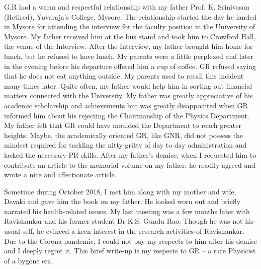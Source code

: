 G.R had a warm and respectful relationship with my father Prof. K. Srinivasan (Retired), Yuvaraja’s College, Mysore. The relationship started the day he landed in Mysore for attending the interview for the faculty position in the University of Mysore. My father received him at the bus stand and took him to Crawford Hall, the venue of the Interview. After the Interview, my father brought him home for lunch, but he refused to have lunch. My parents were a little perplexed and later in the evening before his departure offered him a cup of coffee.  GR refused saying that he does not eat anything outside. My parents used to recall this incident many times later. Quite often, my father would help him in sorting out financial matters connected with the University. My father was greatly appreciative of his academic scholarship and achievements but was greatly disappointed when GR informed him about his rejecting the Chairmanship of the Physics Department. My father felt that GR could have moulded the Department to reach greater heights.  Maybe, the academically oriented GR, like GNR, did not possess the mindset required for tackling the nitty-gritty of day to day administration and lacked the necessary PR skills. After my father’s demise, when I requested him to contribute an article to the memorial volume on my father, he readily agreed and wrote a nice and affectionate article.

Sometime during October 2018, I met him along with my mother and wife, Devaki and gave him the book on my father. He looked worn out and briefly narrated his health-related issues. My last meeting was a few months later with Ravishankar and his former student Dr K.S. Gundu Rao. Though he was not his usual self, he evinced a keen interest in the research activities of Ravishankar. Due to the Corona pandemic, I could not pay my respects to him after his demise and I deeply regret it. This brief write-up is my respects to GR – a rare Physicist of a bygone era.

